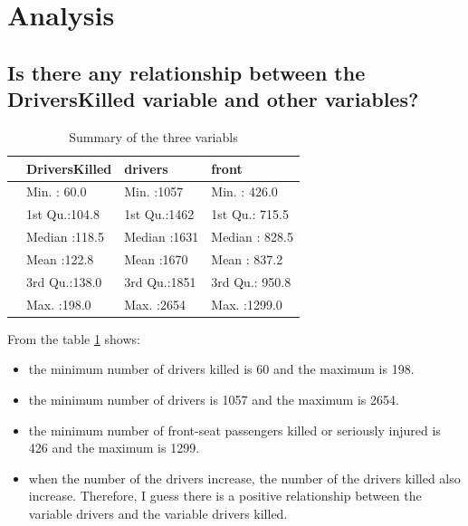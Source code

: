 \documentclass[11pt,a4paper,]{article}
\begin{document}
\hypertarget{analysis}{%
\section{Analysis}\label{analysis}}

\hypertarget{is-there-any-relationship-between-the-driverskilled-variable-and-other-variables}{%
\subsection{Is there any relationship between the DriversKilled variable and other variables?}\label{is-there-any-relationship-between-the-driverskilled-variable-and-other-variables}}

\begin{table}

\caption{\label{tab:mytables}Summary of the three variabls}
\centering
\begin{tabular}[t]{l|l|l|l}
\hline
  & DriversKilled &    drivers &     front\\
\hline
 & Min.   : 60.0 & Min.   :1057 & Min.   : 426.0\\
\hline
 & 1st Qu.:104.8 & 1st Qu.:1462 & 1st Qu.: 715.5\\
\hline
 & Median :118.5 & Median :1631 & Median : 828.5\\
\hline
 & Mean   :122.8 & Mean   :1670 & Mean   : 837.2\\
\hline
 & 3rd Qu.:138.0 & 3rd Qu.:1851 & 3rd Qu.: 950.8\\
\hline
 & Max.   :198.0 & Max.   :2654 & Max.   :1299.0\\
\hline
\end{tabular}
\end{table}

From the table \ref{tab:mytables} shows:

\begin{itemize}
\item
  the minimum number of drivers killed is 60 and the maximum is 198.
\item
  the minimum number of drivers is 1057 and the maximum is 2654.
\item
  the minimum number of front-seat passengers killed or seriously injured is 426 and the maximum is 1299.
\item
  when the number of the drivers increase, the number of the drivers killed also increase. Therefore, I guess there is a positive relationship between the variable drivers and the variable drivers killed.
\end{itemize}
\end{document}
